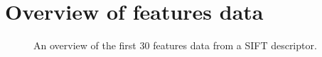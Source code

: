 
\section*{Overview of features data}

\begin{figure}[H]
    \captionsetup{width=0.85\linewidth}
    \captionsetup{justification=centering}
    \caption{An overview of the first 30 features data from a SIFT descriptor.}
    \label{fig:1-data_analysis-feature_representation}
\end{figure}
